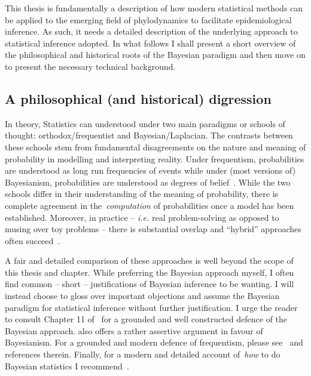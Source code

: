 This thesis is fundamentally a description of how modern statistical methods can be applied to the emerging field of phylodynamics to facilitate epidemiological inference.
As such, it needs a detailed description of the underlying approach to statistical inference adopted.
In what follows I shall present a short overview of the philosophical and historical roots of the Bayesian paradigm and then move on to present the necessary technical background.

\subsection{A philosophical (and historical) digression}

In theory, Statistics can understood under two main paradigms or schools of thought: orthodox/frequentist and Bayesian/Laplacian.
The contrasts between these schools stem from fundamental disagreements on the nature and meaning of probability in modelling and interpreting reality.
Under frequentism, probabilities are understood as long run frequencies of events while under (most versions of) Bayesianism, probabilities are understood as degrees of belief~\citep{Lindley2000}.
While the two schools differ in their understanding of the meaning of probability, there is complete agreement in the~\textit{computation} of probabilities once a model has been established.
Moreover, in practice -- \textit{i.e.} real problem-solving as opposed to musing over toy problems -- there is substantial overlap and ``hybrid'' approaches often succeed~\citep{Kass2011}.

A fair and detailed comparison of these approaches is well beyond the scope of this thesis and chapter.
While preferring the Bayesian approach myself, I often find common -- short --  justifications of Bayesian inference to be wanting.
I will instead choose to gloss over important objections and assume the Bayesian paradigm for statistical inference without further justification.
I urge the reader to consult Chapter 11 of~\cite{Robert2007} for a grounded and well constructed defence of the Bayesian approach.
\cite{Jaynes2003} also offers a rather assertive argument in favour of Bayesianism.
For a grounded and modern defence of frequentism, please see~\cite{Mayo2011} and references therein.
Finally, for a modern and detailed account of~\textit{how} to do Bayesian statistics I recommend~\cite{Gelman2014b}.

